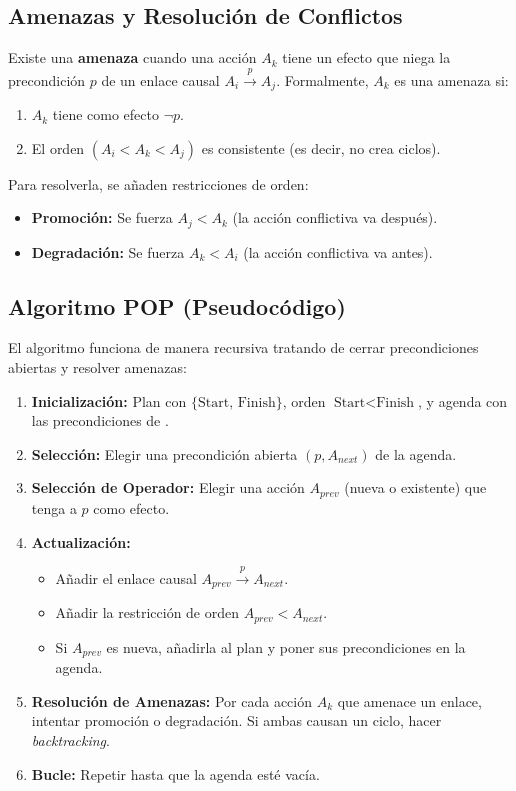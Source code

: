 \subsection{Amenazas y Resolución de Conflictos}
Existe una \textbf{amenaza} cuando una acción $A_k$ tiene un efecto que niega la precondición $p$ de un enlace causal $A_i \xrightarrow{p} A_j$. Formalmente, $A_k$ es una amenaza si:
\begin{enumerate}
    \item $A_k$ tiene como efecto $\neg p$.
    \item El orden $(A_i < A_k < A_j)$ es consistente (es decir, no crea ciclos).
\end{enumerate}

Para resolverla, se añaden restricciones de orden:
\begin{itemize}
    \item \textbf{Promoción:} Se fuerza $A_j < A_k$ (la acción conflictiva va después).
    \item \textbf{Degradación:} Se fuerza $A_k < A_i$ (la acción conflictiva va antes).
\end{itemize}

\subsection{Algoritmo POP (Pseudocódigo)}
El algoritmo funciona de manera recursiva tratando de cerrar precondiciones abiertas y resolver amenazas:

\begin{enumerate}
    \item \textbf{Inicialización:} Plan con $\{\text{Start, Finish}\}$, orden $\text{Start} < \text{Finish}$, y agenda con las precondiciones de .
    \item \textbf{Selección:} Elegir una precondición abierta $(p, A_{next})$ de la agenda.
    \item \textbf{Selección de Operador:} Elegir una acción $A_{prev}$ (nueva o existente) que tenga a $p$ como efecto.
    \item \textbf{Actualización:}
    \begin{itemize}
        \item Añadir el enlace causal $A_{prev} \xrightarrow{p} A_{next}$.
        \item Añadir la restricción de orden $A_{prev} < A_{next}$.
        \item Si $A_{prev}$ es nueva, añadirla al plan y poner sus precondiciones en la agenda.
    \end{itemize}
    \item \textbf{Resolución de Amenazas:} Por cada acción $A_k$ que amenace un enlace, intentar promoción o degradación. Si ambas causan un ciclo, hacer \textit{backtracking}.
    \item \textbf{Bucle:} Repetir hasta que la agenda esté vacía.
\end{enumerate}

